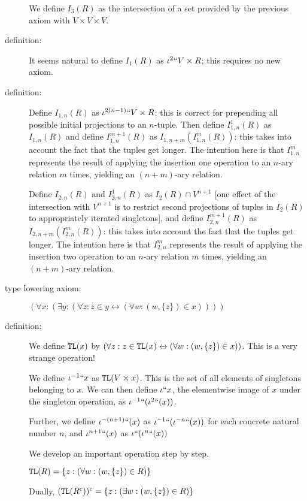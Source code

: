 \documentclass{article}
\theoremstyle{definition}
\theoremstyle{remark}
\begin{document}
\begin{description}
We define $I_3(R)$ as the intersection of a set provided by the previous axiom with $V \times V \times V$.

\item[definition:]  It seems natural to define $I_1(R)$ as $\iota^2``V \times R$; this requires no new axiom.

\item[definition:]  Define $I_{1,n}(R)$ as $\iota^{2(n-1)}``V \times R$:  this is correct for prepending all possible initial projections
to an $n$-tuple.  Then define $I^1_{1,n}(R)$ as $I_{1,n}(R)$ and define $I^{m+1}_{1,n}(R)$ as $I_{1,n+m}(I^m_{1,n}(R))$:  this takes
into account the fact that the tuples get longer.   The intention here is that $I^m_{1,n}$ represents the result of applying the insertion one operation to an $n$-ary relation $m$ times, yielding an $(n+m)$-ary relation.

Define $I_{2,n}(R)$ and $I^1_{2,n}(R)$ as $I_2(R) \cap V^{n+1}$ [one effect of the intersection with $V^{n+1}$ is to restrict second projections of tuples in $I_2(R)$  to appropriately iterated singletons], and define $I^{m+1}_{2,n}(R)$ as $I_{2
,n+m}(I^m_{2,n}(R))$:   this takes
into account the fact that the tuples get longer.  The intention here is that $I^m_{2,n}$ represents the result of applying the insertion two operation to an $n$-ary relation $m$ times, yielding an $(n+m)$-ary relation.

\item[type lowering axiom:]  $(\forall x:(\exists y:(\forall z:z \in y \leftrightarrow (\forall w:(w,\{z\}) \in x))))$

\item[definition:]
We define ${\tt TL}(x)$ by $(\forall z:z \in {\tt TL}(x) \leftrightarrow (\forall w:(w,\{z\}) \in x))$.  This is a very strange operation!

We define $\iota^{-1}``x$ as ${\tt TL}(V \times x)$.  This is the set of all elements of singletons
belonging to $x$.  We can then define $\iota``x$, the elementwise image of $x$ under the singleton operation, as $\iota^{-1}``(\iota^2``(x))$.

Further, we define $\iota^{-(n+1)}``(x)$ as $\iota^{-1}``(\iota^{-n}``(x))$ for each concrete natural number $n$, and $\iota^{n+1}``(x)$ as $\iota``(\iota^{n}``(x))$

We develop an important operation step by step.

${\tt TL}(R) = \{z:(\forall w:(w,\{z\})\in R)\}$

Dually, $({\tt TL}(R^c))^c = \{z:(\exists w:(w,\{z\})\in R)\}$


\end{description}
\end{document}
